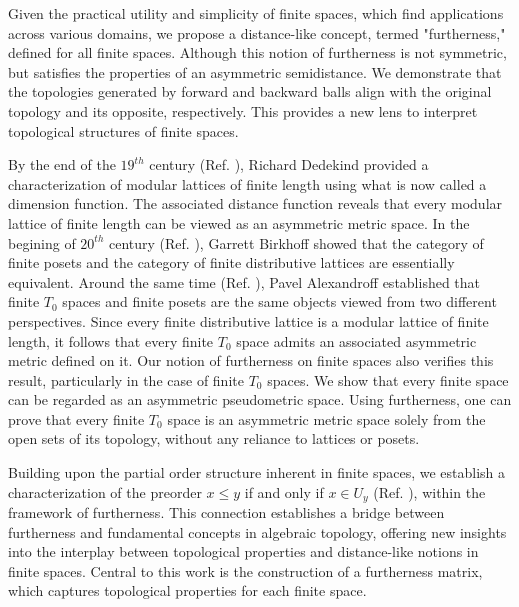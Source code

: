 \documentclass[12pt]{amsart}
\begin{document}
	Given the practical utility and simplicity of finite spaces, which find applications across various domains, we propose a distance-like concept, termed "furtherness," defined for all finite spaces. Although this notion of furtherness is  not symmetric, but satisfies the properties of an asymmetric semidistance.
	 We demonstrate that the topologies generated by forward and backward balls align with the original topology and its opposite, respectively. This provides a new lens to  interpret topological structures of finite spaces.\par 
	
	By the end of the $19^{th}$ century (Ref. \cite{Dedekind}), Richard Dedekind provided a characterization of modular lattices of finite length using what is now called a dimension function. The associated distance function reveals that every modular lattice of finite length can be viewed as an asymmetric metric space. In the begining of $20^{th}$ century (Ref. \cite{Birkhoff,Birkhoff2}), Garrett Birkhoff showed that the category of finite posets and the category of finite distributive lattices are essentially equivalent. Around the same time (Ref. \cite{Alexandroff}), Pavel Alexandroff established that finite $T_0$	spaces and finite posets are the same objects viewed from two different perspectives. Since every finite distributive lattice is a modular lattice of finite length, it follows that every finite $T_0$	space admits an associated asymmetric metric defined on it. Our notion of furtherness on finite spaces also verifies this result, particularly in the case of finite $T_0$	spaces. We show that every finite space can be regarded as an asymmetric pseudometric space. Using furtherness, one can prove that every finite $T_0$ space is an asymmetric metric space solely from the open sets of its topology, without any reliance to lattices or posets.\par
	
	Building upon the partial order structure inherent in finite spaces,  we establish a characterization of the preorder $x\leq y$ if and only if $x\in U_y$ (Ref. \cite{Stong}), %
	 within the framework of furtherness. This connection establishes a bridge between furtherness and fundamental concepts in algebraic topology,  offering new insights into the interplay between topological properties and distance-like notions in finite spaces.
	Central to this work is the construction of a furtherness matrix, which captures topological properties for each finite space. \par 
	
\end{document}
